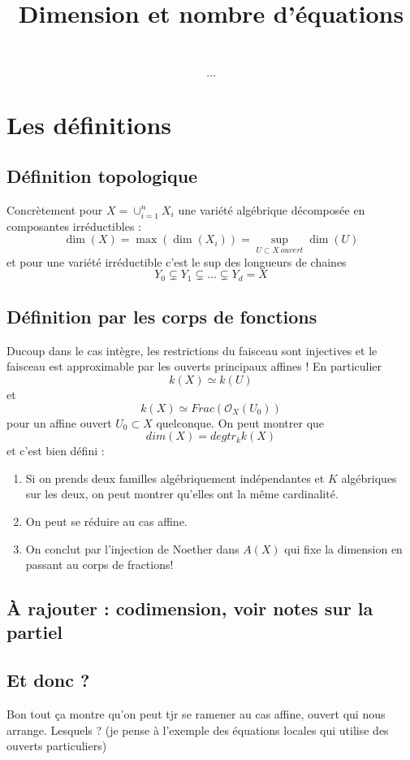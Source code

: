 \documentclass[a4paper,12pt]{book}
\title{Dimension et nombre d'équations}
\date{}
\newcommand{\Or}{\mathcal{O}}
\theoremstyle{plain}
\theoremstyle{definition}
\theoremstyle{remark}
\begin{document}
\maketitle
\tableofcontents
\[\ldots\]   

\chapter{Les définitions}
\section{Définition topologique}
Concrètement pour $X=\cup_{i=1}^n X_i$ une variété algébrique décomposée
en composantes irréductibles :
\[\dim(X)=\max(\dim(X_i))=\sup_{U\subset X~ouvert} \dim(U)\]
et pour une variété irréductible c'est le sup des longueurs de chaines
\[Y_0\subsetneq Y_1\subsetneq \ldots \subsetneq Y_d=X\]

\section{Définition par les corps de fonctions}
Ducoup dans le cas intègre, les restrictions du faisceau sont 
injectives et le faisceau est approximable par les ouverts principaux
affines ! En particulier 
\[k(X)\simeq k(U)\]
et \[k(X)\simeq Frac(\Or_X(U_0))\]
pour un affine ouvert $U_0\subset X$ quelconque. On peut montrer que
\[dim(X)= degtr_k k(X)\]
et c'est bien défini :
\begin{enumerate}
    \item Si on prends deux familles algébriquement 
indépendantes et $K$ algébriques sur les deux, on peut montrer qu'elles
ont la même cardinalité. 
    \item On peut se réduire au cas affine.
    \item On conclut par l'injection de Noether dans $A(X)$ qui fixe la
	dimension en passant au corps de fractions!
\end{enumerate}

\section{À rajouter : codimension, voir notes sur la partiel}

\section{Et donc ?}
Bon tout ça montre qu'on peut tjr se ramener au cas affine, ouvert
qui nous arrange. Lesquels ? (je pense à l'exemple des équations
locales qui utilise des ouverts particuliers)
\end{document}
